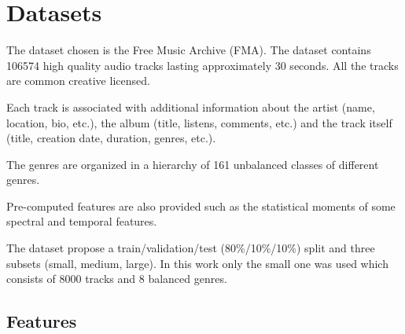 \section{Datasets}

The dataset chosen is the Free Music Archive (FMA).
The dataset contains 106574 high quality audio tracks lasting approximately 30 seconds. All the tracks are common creative licensed.

Each track is associated with additional information about the artist (name, location, bio, etc.), the album (title, listens, comments, etc.) and the track itself (title, creation date, duration, genres, etc.). 

The genres are organized in a hierarchy of 161 unbalanced classes of different genres.

Pre-computed features are also provided such as the statistical moments of some spectral and temporal features.

The dataset propose a train/validation/test (80\%/10\%/10\%) split and three subsets (small, medium, large).
In this work only the small one was used which consists of 8000 tracks and 8 balanced genres.

\subsection{Features}

